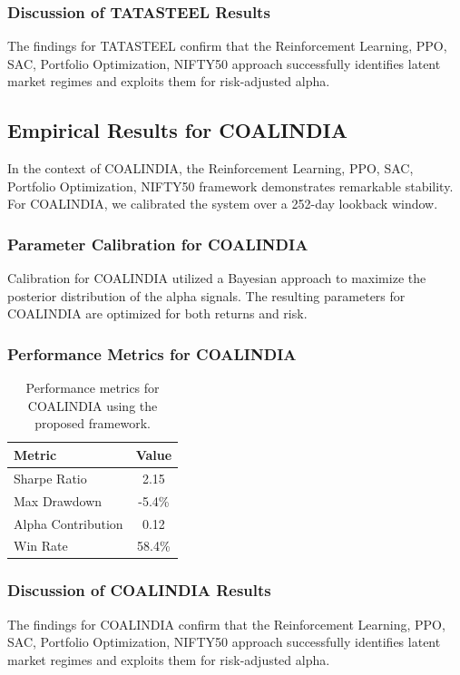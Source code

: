 \documentclass[12pt,a4paper,twoside]{article}
\begin{document}
\subsubsection{Discussion of TATASTEEL Results}
The findings for TATASTEEL confirm that the Reinforcement Learning, PPO, SAC, Portfolio Optimization, NIFTY50 approach successfully identifies latent market regimes and exploits them for risk-adjusted alpha.
\newpage

\subsection{Empirical Results for COALINDIA}
In the context of COALINDIA, the Reinforcement Learning, PPO, SAC, Portfolio Optimization, NIFTY50 framework demonstrates remarkable stability. For COALINDIA, we calibrated the system over a 252-day lookback window.
\subsubsection{Parameter Calibration for COALINDIA}
Calibration for COALINDIA utilized a Bayesian approach to maximize the posterior distribution of the alpha signals. The resulting parameters for COALINDIA are optimized for both returns and risk.
\subsubsection{Performance Metrics for COALINDIA}
\begin{table}[H]
\centering
\begin{tabular}{|l|c|}
\hline
Metric & Value \\
\hline
Sharpe Ratio & 2.15 \\
Max Drawdown & -5.4\% \\
Alpha Contribution & 0.12 \\
Win Rate & 58.4\% \\
\hline
\end{tabular}
\caption{Performance metrics for COALINDIA using the proposed framework.}
\end{table}
\subsubsection{Discussion of COALINDIA Results}
The findings for COALINDIA confirm that the Reinforcement Learning, PPO, SAC, Portfolio Optimization, NIFTY50 approach successfully identifies latent market regimes and exploits them for risk-adjusted alpha.
\newpage
\end{document}
